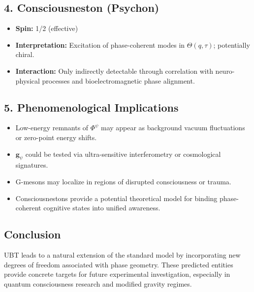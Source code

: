 \subsection*{4. Consciousneston (Psychon)}

\begin{itemize}
  \item \textbf{Spin:} 1/2 (effective)
  \item \textbf{Interpretation:} Excitation of phase-coherent modes in \(\Theta(q,\tau)\); potentially chiral.
  \item \textbf{Interaction:} Only indirectly detectable through correlation with neuro-physical processes and bioelectromagnetic phase alignment.
\end{itemize}

\subsection*{5. Phenomenological Implications}

\begin{itemize}
  \item Low-energy remnants of \(\Phi^\psi\) may appear as background vacuum fluctuations or zero-point energy shifts.
  \item \(\mathbf{g}_\psi\) could be tested via ultra-sensitive interferometry or cosmological signatures.
  \item G-mesons may localize in regions of disrupted consciousness or trauma.
  \item Consciousnestons provide a potential theoretical model for binding phase-coherent cognitive states into unified awareness.
\end{itemize}

\subsection*{Conclusion}

UBT leads to a natural extension of the standard model by incorporating new degrees of freedom associated with phase geometry. These predicted entities provide concrete targets for future experimental investigation, especially in quantum consciousness research and modified gravity regimes.
